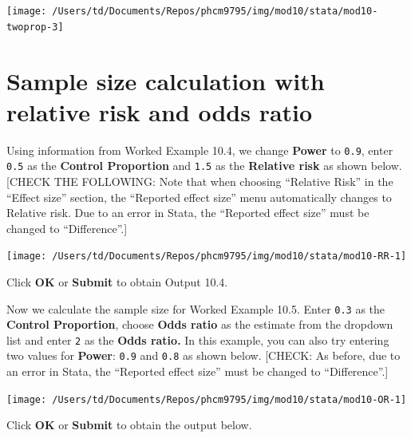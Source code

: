 \documentclass[
]{memoir}
\begin{document}
\texttt{[image: /Users/td/Documents/Repos/phcm9795/img/mod10/stata/mod10-twoprop-3]}

\hypertarget{sample-size-calculation-with-relative-risk-and-odds-ratio}{%
\section{Sample size calculation with relative risk and odds ratio}\label{sample-size-calculation-with-relative-risk-and-odds-ratio}}

Using information from Worked Example 10.4, we change \textbf{Power} to \texttt{0.9}, enter \texttt{0.5} as the \textbf{Control Proportion} and \texttt{1.5} as the \textbf{Relative risk} as shown below. {[}CHECK THE FOLLOWING: Note that when choosing ``Relative Risk'' in the ``Effect size'' section, the ``Reported effect size'' menu automatically changes to Relative risk. Due to an error in Stata, the ``Reported effect size'' must be changed to ``Difference''.{]}

\texttt{[image: /Users/td/Documents/Repos/phcm9795/img/mod10/stata/mod10-RR-1]}

Click \textbf{OK} or \textbf{Submit} to obtain Output 10.4.

Now we calculate the sample size for Worked Example 10.5. Enter \texttt{0.3} as the \textbf{Control Proportion}, choose \textbf{Odds ratio} as the estimate from the dropdown list and enter \texttt{2} as the \textbf{Odds ratio.} In this example, you can also try entering two values for \textbf{Power}: \texttt{0.9} and \texttt{0.8} as shown below. {[}CHECK: As before, due to an error in Stata, the ``Reported effect size'' must be changed to ``Difference''.{]}

\texttt{[image: /Users/td/Documents/Repos/phcm9795/img/mod10/stata/mod10-OR-1]}

Click \textbf{OK} or \textbf{Submit} to obtain the output below.
\end{document}
